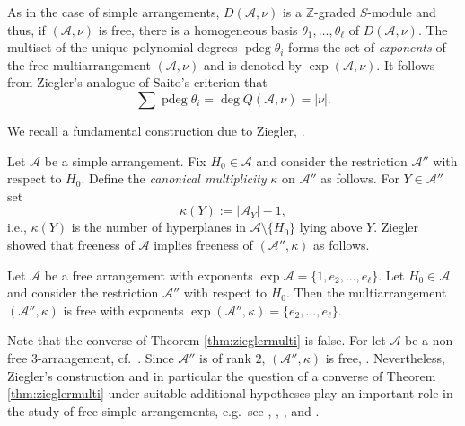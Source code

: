 As in the case of simple arrangements,
$D({{\mathcal A}}, \nu)$ is a ${{\mathbb Z}}$-graded $S$-module and 
thus, if $({{\mathcal A}}, \nu)$ is free, there is a 
homogeneous basis $\theta_1, \ldots, \theta_\ell$ of $D({{\mathcal A}}, \nu)$.
The multiset of the unique polynomial degrees ${\operatorname{pdeg}} \theta_i$ 
forms the set of \emph{exponents} of the free multiarrangement $({{\mathcal A}}, \nu)$
and is denoted by $\exp ({{\mathcal A}}, \nu)$.
It follows from Ziegler's analogue of Saito's criterion 
\cite[Thm.\ 8]{ziegler:multiarrangements} that 
\begin{equation*}
\label{eq:exp}
\sum {\operatorname{pdeg}} \theta_i = \deg Q({{\mathcal A}}, \nu) = |\nu|. 
\end{equation*}

We recall a fundamental 
construction 
due to Ziegler, \cite[Ex.\ 2]{ziegler:multiarrangements}.

\begin{defn}
\label{def:zieglermulti}
Let ${{\mathcal A}}$ be a simple arrangement.
Fix $H_0 \in {{\mathcal A}}$ and  consider the restriction 
${{\mathcal A}}''$ with respect to $H_0$.
Define the \emph{canonical multiplicity} 
$\kappa$ on ${{\mathcal A}}''$ as follows. For $Y \in {{\mathcal A}}''$ set 
\[
\kappa(Y) := |{{\mathcal A}}_Y| -1,
\]
i.e., $\kappa(Y)$ is the number of hyperplanes in ${{\mathcal A}} \setminus\{H_0\}$
lying above $Y$.
Ziegler showed that freeness of ${{\mathcal A}}$ implies 
freeness of $({{\mathcal A}}'', \kappa)$ as follows.
\end{defn}

\begin{theorem}
\label{thm:zieglermulti}
Let ${{\mathcal A}}$ be a free arrangement with exponents
$\exp {{\mathcal A}} = \{1, e_2, \ldots, e_\ell\}$.
Let $H_0 \in {{\mathcal A}}$ and consider the restriction 
${{\mathcal A}}''$ with respect to $H_0$.
Then the multiarrangement $({{\mathcal A}}'', \kappa)$ is free with
exponents
$\exp ({{\mathcal A}}'', \kappa) = \{e_2, \ldots, e_\ell\}$. 
\end{theorem}

Note that 
the converse of Theorem \ref{thm:zieglermulti} is false.
For let ${{\mathcal A}}$ be a non-free $3$-arrangement, 
cf.~\cite[Ex.\ 4.34]{orlikterao:arrangements}.
Since ${{\mathcal A}}''$ is of rank $2$,
$({{\mathcal A}}'', \kappa)$ is free, 
\cite[Cor.\ 7]{ziegler:multiarrangements}.
Nevertheless, 
Ziegler's construction 
and in particular the question of a converse
of Theorem \ref{thm:zieglermulti}
under suitable additional hypotheses 
play an important role in the 
study of free simple arrangements, e.g.\
see
\cite[Thm.\ 2.1, Thm.\ 2.2]{yoshinaga:free04},
\cite{yoshinaga:free05},
\cite[Cor.\ 4.2]{abeyoshinaga},
\cite[Thm.\ 2]{schulze:free} and
\cite[Cor.\ 1.35]{yoshinaga:free14}.

